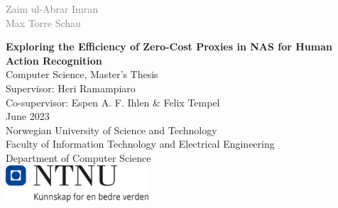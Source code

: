 \begin{titlepage}
        \vspace*{0.3cm}
        \noindent
        \textcolor{gray}{\Large Zaim ul-Abrar Imran}\\[0.2cm]
        \textcolor{gray}{\Large Max Torre Schau}\\
        
        \vspace{0.6cm}

        
        {\noindent \huge \bfseries Exploring the Efficiency of \newline Zero-Cost Proxies in NAS for \newline Human Action Recognition }\\


        \vspace{6.0cm}
        \noindent
        Computer Science, Master's Thesis \\
        Supervisor: Heri Ramampiaro\\
        Co-supervisor: Espen A. F. Ihlen \& Felix Tempel\\     
        June 2023\\

        \vspace{0.8cm} 
        \noindent
        Norwegian University of Science and Technology\\
        Faculty of Information Technology and Electrical Engineering\\
        Department of Computer Science\\
       
        \vspace{0.8cm}
        \noindent
        \includegraphics[width=0.40\textwidth]{figures/NTNU_logo.png}
\end{titlepage}